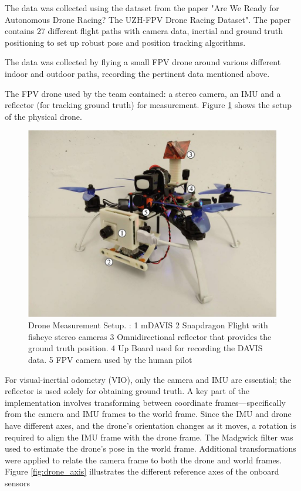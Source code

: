 \documentclass[bare_jrnl_transmag]{subfiles}
\begin{document}
The data was collected using the dataset from the paper "Are We Ready for Autonomous Drone Racing?
The UZH-FPV Drone Racing Dataset"\cite{Delmerico19icra}. The paper contains 27 different flight paths with camera data, inertial and ground truth positioning to set up robust pose and position tracking algorithms. 

The data was collected by flying a small FPV drone around various different indoor and outdoor paths, recording the pertinent data mentioned above. 

The FPV drone used by the team contained: a stereo camera, an IMU and a reflector (for tracking ground truth) for measurement. Figure  \ref{fig:drone_setup} shows the setup of the physical drone.

\begin{figure}[H]
    \centering
    \includegraphics[width=0.8\linewidth]{figures/drone_setup.jpg}
    \caption{Drone Measurement Setup. : 
    1 mDAVIS 2 Snapdragon Flight with fisheye stereo cameras 3 Omnidirectional reflector that provides the ground truth position. 4 Up Board
    used for recording the DAVIS data. 5 FPV camera used by the human pilot \cite{Delmerico19icra}}
    \label{fig:drone_setup}
\end{figure}

For visual-inertial odometry (VIO), only the camera and IMU are essential; the reflector is used solely for obtaining ground truth. A key part of the implementation involves transforming between coordinate frames—specifically from the camera and IMU frames to the world frame. Since the IMU and drone have different axes, and the drone’s orientation changes as it moves, a rotation is required to align the IMU frame with the drone frame. The Madgwick filter was used to estimate the drone’s pose in the world frame. Additional transformations were applied to relate the camera frame to both the drone and world frames. Figure \ref{fig:drone_axis} illustrates the different reference axes of the onboard sensors
\end{document}
